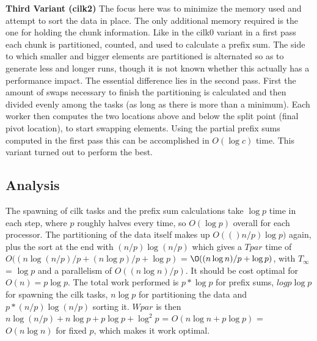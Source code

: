 \documentclass[12pt,a4paper]{article}
\begin{document}
\newline\newline
\textbf{Third Variant (cilk2)}\newline
The focus here was to minimize the memory used and attempt to sort the data in place. The only additional memory required is the one for holding the chunk information. Like in the cilk0 variant in a first pass each chunk is partitioned, counted, and used to calculate a prefix sum. The side to which smaller and bigger elements are partitioned is alternated so as to generate less and longer runs, though it is not known whether this actually has a performance impact. The essential difference lies in the second pass. First the amount of swaps necessary to finish the partitioning is calculated and then divided evenly among the tasks (as long as there is more than a minimum). Each worker then computes the two locations above and below the split point (final pivot location), to start swapping elements. Using the partial prefix sums computed in the first pass this can be accomplished in $O(\log c)$ time. This variant turned out to perform the best.
\subsection{Analysis}
The spawning of cilk tasks and the prefix sum calculations take $\log p$ time in each step, where $p$ roughly halves every time, so $O(\log p)$ overall for each processor. The partitioning of the data itself makes up $O(()n/p)\log p)$ again, plus the sort at the end with $(n/p)\log(n/p)$ which gives a $Tpar$ time of $O((n\log(n/p)/p + (n\log p)/p + \log p)$ = $\O((n\log n)/p + \log p)$, with $T_{\infty}$ = $\log p$ and a parallelism of $O((n\log n)/p)$. It should be cost optimal for $O(n) = p\log p$. 
The total work performed is $p*\log p$ for prefix sums, $log p\log p$ for spawning the cilk tasks, $n\log p$ for partitioning the data and $p*(n/p)\log(n/p)$ sorting it. $Wpar$ is then $n\log(n/p) + n\log p + p\log p + \log^2p$ = $O(n\log n + p\log p)$ = $O(n\log n)$ for fixed $p$, which makes it work optimal.
\end{document}
